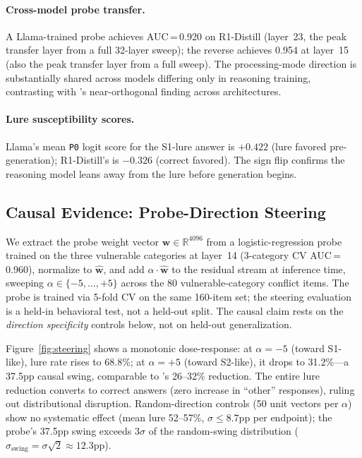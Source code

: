 \documentclass{article}
\newcommand{\sone}{S1-like}
\newcommand{\stwo}{S2-like}
\newcommand{\pzero}{\texttt{P0}}
\begin{document}
\paragraph{Cross-model probe transfer.}
A Llama-trained probe achieves AUC\,=\,0.920 on R1-Distill (layer~23, the peak transfer layer from a full 32-layer sweep); the reverse achieves 0.954 at layer~15 (also the peak transfer layer from a full sweep).  The processing-mode direction is substantially shared across models differing only in reasoning training, contrasting with \citet{huang2026cogbias}'s near-orthogonal finding across architectures.

\paragraph{Lure susceptibility scores.}
Llama's mean \pzero{} logit score for the S1-lure answer is $+0.422$ (lure favored pre-generation); R1-Distill's is $-0.326$ (correct favored).  The sign flip confirms the reasoning model leans away from the lure before generation begins.

\subsection{Causal Evidence: Probe-Direction Steering}
\label{sec:steering}

We extract the probe weight vector $\mathbf{w} \in \mathbb{R}^{4096}$ from a logistic-regression probe trained on the three vulnerable categories at layer~14 (3-category CV AUC\,=\,0.960), normalize to $\hat{\mathbf{w}}$, and add $\alpha \cdot \hat{\mathbf{w}}$ to the residual stream at inference time, sweeping $\alpha \in \{-5, \ldots, +5\}$ across the 80 vulnerable-category conflict items.  The probe is trained via 5-fold CV on the same 160-item set; the steering evaluation is a held-in behavioral test, not a held-out split.  The causal claim rests on the \emph{direction specificity} controls below, not on held-out generalization.

Figure~\ref{fig:steering} shows a monotonic dose-response: at $\alpha = -5$ (toward \sone{}), lure rate rises to 68.8\%; at $\alpha = +5$ (toward \stwo{}), it drops to 31.2\%---a 37.5pp causal swing, comparable to \citet{huang2026cogbias}'s 26--32\% reduction.  The entire lure reduction converts to correct answers (zero increase in ``other'' responses), ruling out distributional disruption.  Random-direction controls (50 unit vectors per $\alpha$) show no systematic effect (mean lure 52--57\%, $\sigma \leq 8.7$pp per endpoint); the probe's 37.5pp swing exceeds $3\sigma$ of the random-swing distribution ($\sigma_{\text{swing}} = \sigma\sqrt{2} \approx 12.3$pp).
\end{document}
